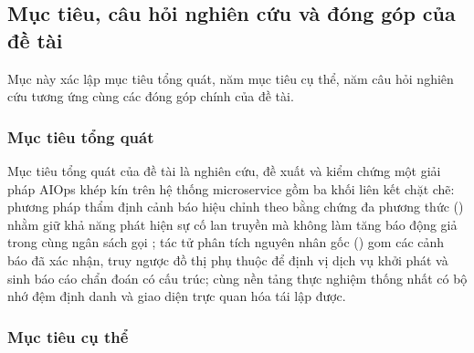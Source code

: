 \subsection{Mục tiêu, câu hỏi nghiên cứu và đóng góp của đề tài}
\label{sec:ch1-muc-tieu}

Mục này xác lập mục tiêu tổng quát, năm mục tiêu cụ thể, năm câu hỏi nghiên cứu tương ứng cùng các đóng góp chính của đề tài.

\subsubsection{Mục tiêu tổng quát}
\label{sec:ch1-muc-tieu-chung}

Mục tiêu tổng quát của đề tài là nghiên cứu, đề xuất và kiểm chứng một giải pháp AIOps khép kín trên hệ thống microservice gồm ba khối liên kết chặt chẽ: phương pháp thẩm định cảnh báo hiệu chỉnh theo bằng chứng đa phương thức (\CTAV{}) nhằm giữ khả năng phát hiện sự cố lan truyền mà không làm tăng báo động giả trong cùng ngân sách gọi ; tác tử phân tích nguyên nhân gốc () gom các cảnh báo đã xác nhận, truy ngược đồ thị phụ thuộc để định vị dịch vụ khởi phát và sinh báo cáo chẩn đoán có cấu trúc; cùng nền tảng thực nghiệm thống nhất có bộ nhớ đệm định danh và giao diện trực quan hóa tái lập được.

\subsubsection{Mục tiêu cụ thể}
\label{sec:ch1-muc-tieu-cu-the}

